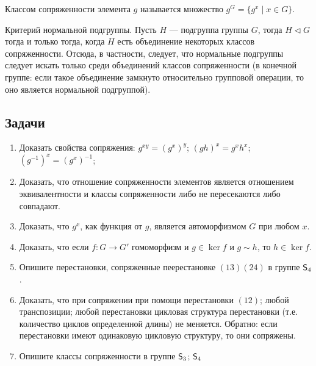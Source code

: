 Классом сопряженности элемента $g$ называется множество $g^G=\{g^x\mid x\in G\}$.

Критерий нормальной подгруппы. Пусть $H$ --- подгруппа группы $G$, тогда $H\triangleleft G$ тогда и только тогда, когда $H$ есть объединение некоторых классов сопряженности. Отсюда, в частности, следует, что нормальные подгруппы следует искать только среди объединений классов сопряженности (в конечной группе: если такое объединение замкнуто относительно групповой операции, то оно является нормальной подгруппой).


\subsection*{Задачи}

\begin{enumerate}
\item Доказать свойства сопряжения: \ipunkt $g^{xy}=(g^x)^y$; \ipunkt $(gh)^{x}=g^xh^x$; \ipunkt $(g^{-1})^x=(g^x)^{-1}$;\label{sopr}

\item Доказать, что отношение сопряженности элементов является отношением эквивалентности и классы сопряженности либо не пересекаются либо совпадают.

\item Доказать, что $g^x$, как функция от $g$, является автоморфизмом $G$ при любом $x$.\label{autG}

\item Доказать, что если $f:G\to G'$ гомоморфизм и $g\in\ker f$ и $g\sim h$, то $h\in\ker f$.

\item Опишите перестановки, сопряженные пеерестановке $(13)(24)$ в группе ${\mathsf{S}}_4$.

\item Доказать, что при сопряжении при помощи \ipunkt перестановки $(12)$; \ipunkt любой транспозиции; \ipunkt любой перестановки цикловая структура перестановки (т.е. количество циклов определенной длины) не меняется. \ipunkt Обратно: если перестановки имеют одинаковую цикловую структуру, то они сопряжены.

\item Опишите классы сопряженности в группе \ipunkt ${\mathsf{S}}_3$; \ipunkt ${\mathsf{S}}_4$


\end{enumerate}
